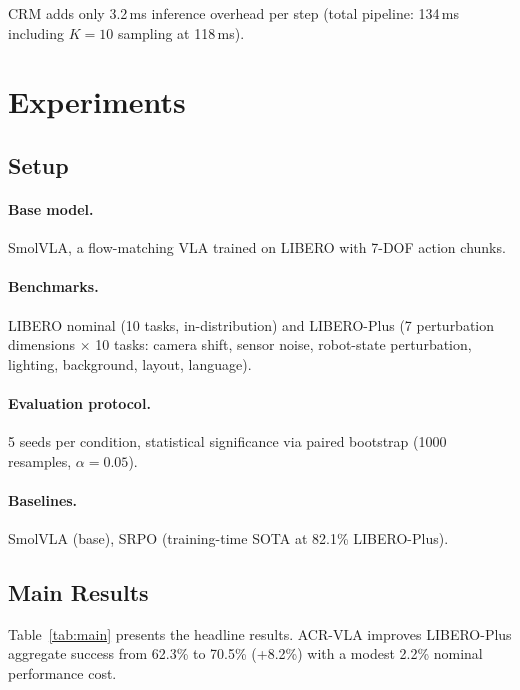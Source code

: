 \documentclass[letterpaper]{article}
\begin{document}
CRM adds only 3.2\,ms inference overhead per step (total pipeline: 134\,ms including $K{=}10$ sampling at 118\,ms).

\section{Experiments}
\label{sec:experiments}

\subsection{Setup}

\paragraph{Base model.} SmolVLA, a flow-matching VLA trained on LIBERO with 7-DOF action chunks.

\paragraph{Benchmarks.}
LIBERO nominal (10 tasks, in-distribution) and LIBERO-Plus (7 perturbation dimensions $\times$ 10 tasks: camera shift, sensor noise, robot-state perturbation, lighting, background, layout, language).

\paragraph{Evaluation protocol.}
5 seeds per condition, statistical significance via paired bootstrap (1000 resamples, $\alpha{=}0.05$).

\paragraph{Baselines.}
SmolVLA (base), SRPO (training-time SOTA at 82.1\% LIBERO-Plus).

\subsection{Main Results}

Table~\ref{tab:main} presents the headline results.
ACR-VLA improves LIBERO-Plus aggregate success from 62.3\% to 70.5\% (+8.2\%) with a modest 2.2\% nominal performance cost.
\end{document}
